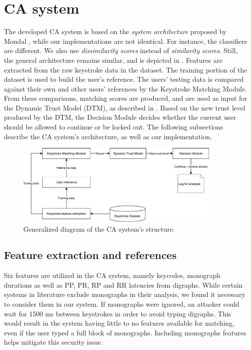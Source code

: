\section{CA system}
\label{sec:system-design_CA-system}
The developed CA system is based on the \textit{system architecture} proposed by Mondal \cite{mondal}, while our implementations are not identical.
For instance, the classifiers are different. 
We also use \textit{dissimilarity scores} instead of \textit{similarity scores}.
Still, the general architecture remains similar, and is depicted in .
Features are extracted from the raw keystroke data in the dataset.
The training portion of the dataset is used to build the user's reference. 
The users' testing data is compared against their own and other users' references by the Keystroke Matching Module.
From these comparisons, matching scores are produced, and are used as input for the Dynamic Trust Model (DTM), as described in .
Based on the new trust level produced by the DTM, the Decision Module decides whether the current user should be allowed to continue or be locked out.
The following subsections describe the CA system's architecture, as well as our implementation.

\begin{figure}[h]
    \centering
    \includegraphics[width=0.9\textwidth]{figures/CA-diagram.pdf}
    \caption{Generalized diagram of the CA system's structure.}
    \label{fig:CA-diagram}
\end{figure}


\subsection{Feature extraction and references}
\label{sec:system-design-CA-ref}
Six features are utilized in the CA system, namely keycodes, monograph durations as well as PP, PR, RP and RR latencies from digraphs.
While certain systems in literature exclude monographs in their analysis, we found it necessary to consider them in our system.
If monographs were ignored, an attacker could wait for 1500 ms between keystrokes in order to avoid typing digraphs.
This would result in the system having little to no features available for matching, even if the user typed a full block of monographs.
Including monographs features helps mitigate this security issue.

